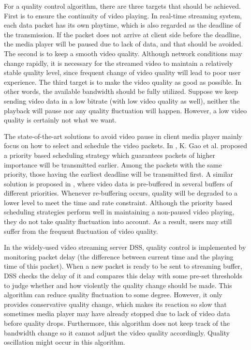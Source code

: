 \documentclass[journal]{IEEEtran}
\begin{document}
For a quality control algorithm, there are three targets that should be achieved. First is to ensure the continuity of video playing. In real-time streaming system, each data packet has its own playtime, which is also regarded as the deadline of the transmission. If the packet does not arrive at client side before the deadline, the media player will be paused due to lack of data, and that should be avoided. The second is to keep a smooth video quality. Although network conditions may change rapidly, it is necessary for the streamed video to maintain a relatively stable quality level, since frequent change of video quality will lead to poor user experience. The third target is to make the video quality as good as possible. In other words, the available bandwidth should be fully utilized. Suppose we keep sending video data in a low bitrate (with low video quality as well), neither the playback will pause nor any quality fluctuation will happen. However, a low video quality is certainly not what we want.

The state-of-the-art solutions to avoid video pause in client media player mainly focus on how to select and schedule the video packets. In \cite{Gao06}, K. Gao et al. proposed a priority based scheduling strategy which guarantees packets of higher importance will be transmitted earlier. Among the packets with the same priority, those having the earliest deadline will be transmitted first. A similar solution is proposed in \cite{Schierl10}, where video data is pre-buffered in several buffers of different priorities. Whenever re-buffering occurs, quality will be degraded to a lower level to meet the time and rate constraint. Although the priority based scheduling strategies perform well in maintaining a non-paused video playing, they do not take quality fluctuation into account. As a result, users may still suffer from the frequent fluctuation of video quality.

In the widely-used video streaming server DSS, quality control is implemented by monitoring packet delay (the difference between current time and the playing time of this packet). When a new packet is ready to be sent to streaming buffer, DSS checks the delay of it and compares this delay with some pre-set thresholds to judge whether and how violently the quality change should be made. This algorithm can reduce quality fluctuation to some degree. However, it only provides conservative quality change, which makes its reaction so slow that sometimes media player may have already stopped due to lack of video data before quality drops. Furthermore, this algorithm does not keep track of the bandwidth change so it cannot adjust the video quality accordingly. Quality oscillation might occur in this algorithm.
\end{document}
